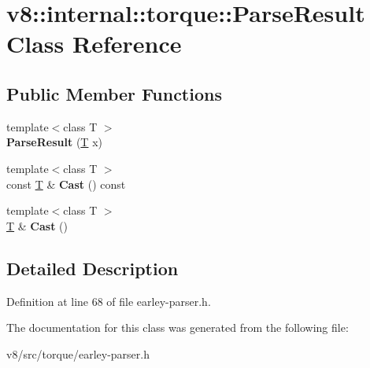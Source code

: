 \hypertarget{classv8_1_1internal_1_1torque_1_1ParseResult}{}\section{v8\+:\+:internal\+:\+:torque\+:\+:Parse\+Result Class Reference}
\label{classv8_1_1internal_1_1torque_1_1ParseResult}
\subsection*{Public Member Functions}
\begin{DoxyCompactItemize}
\item 
\mbox{\label{classv8_1_1internal_1_1torque_1_1ParseResult_a1fa5ae33aeb24f765d386bfef9a20ac9}} 
{\footnotesize template$<$class T $>$ }\\{\bfseries Parse\+Result} (\mbox{\hyperlink{classv8_1_1internal_1_1torque_1_1T}{T}} x)
\item 
\mbox{\label{classv8_1_1internal_1_1torque_1_1ParseResult_a27bdd1ff5c2c2078e34689ccb12a380a}} 
{\footnotesize template$<$class T $>$ }\\const \mbox{\hyperlink{classv8_1_1internal_1_1torque_1_1T}{T}} \& {\bfseries Cast} () const
\item 
\mbox{\label{classv8_1_1internal_1_1torque_1_1ParseResult_af32d3f8619f21768c4bd0a2921277030}} 
{\footnotesize template$<$class T $>$ }\\\mbox{\hyperlink{classv8_1_1internal_1_1torque_1_1T}{T}} \& {\bfseries Cast} ()
\end{DoxyCompactItemize}


\subsection{Detailed Description}


Definition at line 68 of file earley-\/parser.\+h.



The documentation for this class was generated from the following file\+:\begin{DoxyCompactItemize}
\item 
v8/src/torque/earley-\/parser.\+h\end{DoxyCompactItemize}

